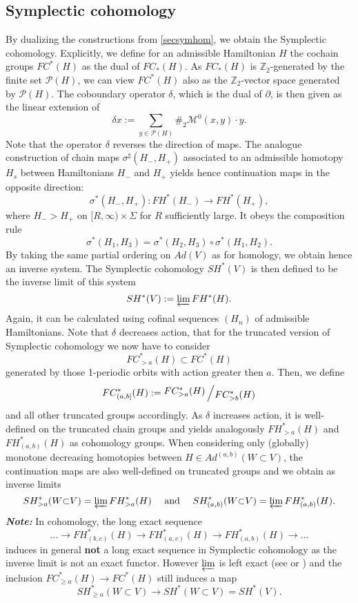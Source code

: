 \documentclass[a4paper,12pt,bibliography=totocnumbered,titlepage=false,abstracton,bookmarksnumbered=true]{scrartcl}
\theoremstyle{definition}
\begin{document}
\subsection{Symplectic cohomology}\label{secSymCoHom}
By dualizing the constructions from \ref{secsymhom}, we obtain the Symplectic cohomology. Explicitly, we define for an admissible Hamiltonian $H$ the cochain groups $FC^\ast(H)$ as the dual of $FC_\ast(H)$. As $FC_\ast(H)$ is $\mathbb{Z}_2$-generated by the finite set $\mathcal{P}(H)$, we can view $FC^\ast(H)$ also as the $\mathbb{Z}_2$-vector space generated by $\mathcal{P}(H)$. The coboundary operator $\delta$, which is the dual of $\partial$, is then given as the linear extension of
\[\delta x:=\sum_{y\in\mathcal{P}(H)} \#_2 \mathcal{M}^0(x,y)\cdot y.\]
Note that the operator $\delta$ reverses the direction of maps. The analogue construction of chain maps $\sigma^\sharp(H_-,H_+)$ associated to an admissible homotopy $H_s$ between Hamiltonians $H_-$ and $H_+$ yields hence continuation maps in the opposite direction:
\[\sigma^\ast(H_-,H_+):FH^\ast(H_-)\rightarrow FH^\ast(H_+),\]
where $H_->H_+$ on $[R,\infty)\times\Sigma$ for $R$ sufficiently large. It obeys the composition rule
\[ \sigma^\ast(H_1,H_3)=\sigma^\ast(H_2,H_3)\circ\sigma^\ast(H_1,H_2).\]
By taking the same partial ordering on $Ad(V)$ as for homology, we obtain hence an inverse system. The Symplectic cohomology $SH^\ast(V)$ is then defined to be the inverse limit of this system
\[SH^\ast(V):=\varprojlim FH^\ast(H).\]
Again, it can be calculated using cofinal sequences $(H_n)$ of admissible Hamiltonians. Note that $\delta$ decreases action, that for the truncated version of Symplectic cohomology we now have to consider 
\[FC^\ast_{>a}(H)\subset FC^\ast(H)\]
generated by those 1-periodic orbits with action greater then $a$. Then, we define
\[ FC_{(a,b]}^\ast(H):=\raisebox{.2em}{$FC^\ast_{>a}(H)$}\left/\raisebox{-.2em}{$FC_{>b}^\ast(H)$}\right.\]
and all other truncated groups accordingly. As $\delta$ increases action, it is well-defined on the truncated chain groups and yields analogously $FH^\ast_{>a}(H)$ and $FH^\ast_{(a,b)}(H)$ as cohomology groups. When considering only (globally) monotone decreasing homotopies between $H\in Ad^{(a,b)}(W{\subset}V)$, the continuation maps are also well-defined on truncated groups and we obtain as inverse limits
\[SH^\ast_{>a}(W{\subset}V)=\varprojlim FH^\ast_{>a}(H)\quad\text{ and }\quad SH^\ast_{(a,b)}(W{\subset}V)=\varprojlim FH^\ast_{(a,b)}(H).\]
\textbf{\textit{Note:}} In cohomology, the long exact sequence
\[\dots\rightarrow FH^\ast_{(b,c)}(H)\rightarrow FH^\ast_{(a,c)}(H)\rightarrow FH^\ast_{(a,b)}(H)\rightarrow\dots\]
induces in general \textbf{not} a long exact sequence in Symplectic cohomology as the inverse limit is not an exact functor. However $\varprojlim$ is left exact (see \cite{bourbaki2} or \cite{eilenberg}) and the inclusion $FC^\ast_{\geq a}(H)\rightarrow FC^\ast(H)$ still induces a map
\[SH^\ast_{\geq a}(W{\subset}V)\rightarrow SH^\ast(W{\subset}V)=SH^\ast(V).\]
\end{document}
